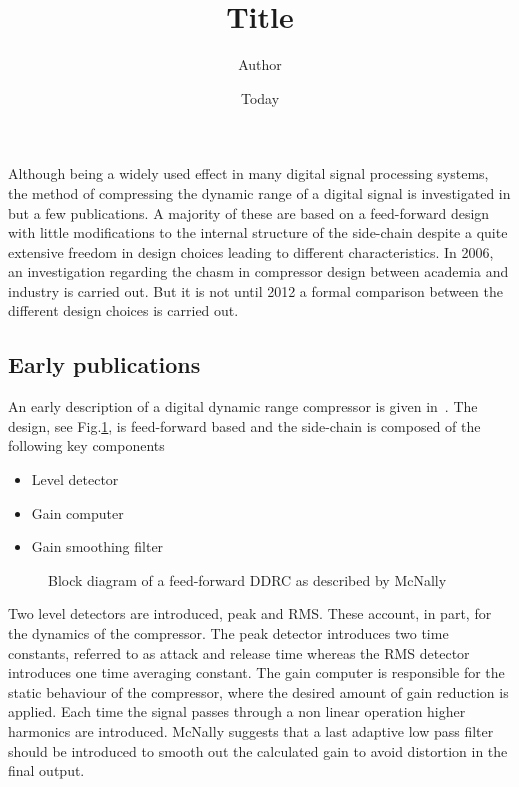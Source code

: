 \documentclass[]{article}
\begin{document}
\title{Title}
\author{Author}
\date{Today}
\maketitle
\section*{}
Although being a widely used effect in many digital signal processing systems, the method of compressing the dynamic range of a digital signal is investigated in but a few publications. A majority of these are based on a feed-forward design with little modifications to the internal structure of the side-chain despite a quite extensive freedom in design choices leading to different characteristics.  In 2006, an investigation regarding the chasm in compressor design between academia and industry is carried out. But it is not until 2012 a formal comparison between the different design choices is carried out.

\subsection*{Early publications}
An early description of a digital dynamic range compressor is given in~\cite{mcnally1984dynamic}. The design, see Fig.\ref{fig:mcnaBlock}, is feed-forward based and the side-chain is composed of the following key components
\begin{itemize}
\item{Level detector}
\item{Gain computer}
\item{Gain smoothing filter}
\end{itemize}
\begin{figure}

\caption{Block diagram of a feed-forward DDRC as described by McNally}
\label{fig:mcnaBlock}
\end{figure}
Two level detectors are introduced, peak and RMS. These account, in part, for the dynamics of the compressor. The peak detector introduces two time constants, referred to as attack and release time whereas the RMS detector introduces one time averaging constant. The gain computer is responsible for the static behaviour of the compressor, where the desired amount of gain reduction is applied. Each time the signal passes through a non linear operation higher harmonics are introduced. McNally suggests that a last adaptive low pass filter should be introduced to smooth out the calculated gain to avoid distortion in the final output.
\end{document}
